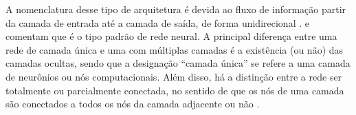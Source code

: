 \documentclass{automatextcc}
\begin{document}





A nomenclatura desse tipo de arquitetura é devida ao fluxo de informação partir da camada de entrada até a camada de saída, de forma unidirecional \citep{goodfellow2016}. \citet{hastie2009} e \citet{fan2021} comentam que é o tipo padrão de rede neural. A principal diferença entre uma rede de camada única e uma com múltiplas camadas é a existência (ou não) das camadas ocultas, sendo que a designação ``camada única'' se refere a uma camada de neurônios ou nós computacionais. Além disso, há a distinção entre a rede ser totalmente ou parcialmente conectada, no sentido de que os nós de uma camada são conectados a todos os nós da camada adjacente ou não \citep{haykin2008}. 
\end{document}
